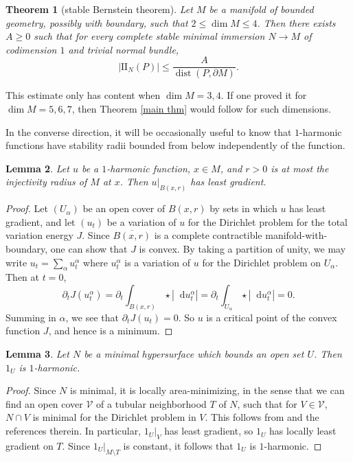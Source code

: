 \documentclass[reqno,11pt]{amsart}
\newcommand*\dif{\mathop{}\!\mathrm{d}}
\DeclareMathOperator{\dist}{dist}
\newcommand{\Two}{\mathrm{I\!I}}
\newtheorem{theorem}{Theorem}[section]
\newtheorem{lemma}[theorem]{Lemma}
\theoremstyle{definition}
\numberwithin{equation}{section}
\begin{document}
\begin{theorem}[stable Bernstein theorem]\label{stable Bernstein}
	Let $M$ be a manifold of bounded geometry, possibly with boundary, such that $2 \leq \dim M \leq 4$.
	Then there exists $A \geq 0$ such that for every complete stable minimal immersion $N \to M$ of codimension $1$ and trivial normal bundle,
	$$|\Two_N(P)| \leq \frac{A}{\dist(P, \partial M)}.$$
\end{theorem}

This estimate only has content when $\dim M = 3, 4$.
If one proved it for $\dim M = 5, 6, 7$, then Theorem \ref{main thm} would follow for such dimensions.

In the converse direction, it will be occasionally useful to know that $1$-harmonic functions have stability radii bounded from below independently of the function.

\begin{lemma} \label{LLG implies LG}
Let $u$ be a $1$-harmonic function, $x \in M$, and $r > 0$ is at most the injectivity radius of $M$ at $x$.
Then $u|_{B(x, r)}$ has least gradient.
\end{lemma}
\begin{proof}
Let $(U_\alpha)$ be an open cover of $B(x, r)$ by sets in which $u$ has least gradient, and let $(u_t)$ be a variation of $u$ for the Dirichlet problem for the total variation energy $J$.
Since $\overline{B(x, r)}$ is a complete contractible manifold-with-boundary, one can show that $J$ is convex.
By taking a partition of unity, we may write $u_t = \sum_\alpha u_t^\alpha$ where $u_t^\alpha$ is a variation of $u$ for the Dirichlet problem on $U_\alpha$.
Then at $t = 0$,
$$\partial_t J(u_t^\alpha) = \partial_t \int_{B(x, r)} \star |\dif u_t^\alpha| = \partial_t \int_{U_\alpha} \star |\dif u_t^\alpha| = 0.$$
Summing in $\alpha$, we see that $\partial_t J(u_t) = 0$.
So $u$ is a critical point of the convex function $J$, and hence is a minimum.
\end{proof}

\begin{lemma}\label{minimal implies 1 harmonic}
Let $N$ be a minimal hypersurface which bounds an open set $U$.
Then $1_U$ is $1$-harmonic.
\end{lemma}
\begin{proof}
Since $N$ is minimal, it is locally area-minimizing, in the sense that we can find an open cover $\mathcal V$ of a tubular neighborhood $T$ of $N$, such that for $V \in \mathcal V$, $N \cap V$ is minimal for the Dirichlet problem in $V$.
This follows from \cite[\S2]{Lawlor96} and the references therein.
In particular, $1_U|_V$ has least gradient, so $1_U$ has locally least gradient on $T$.
Since $1_U|_{M \setminus T}$ is constant, it follows that $1_U$ is $1$-harmonic.
\end{proof}
\end{document}
